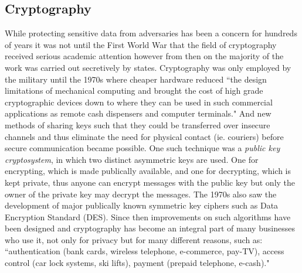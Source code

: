 \documentclass[12pt, titlepage]{article}
\begin{document}
\subsection*{Cryptography}
While protecting sensitive data from adversaries has been a concern for hundreds of years it was not until the First World War that the field of cryptography received serious academic attention however from then on the majority of the work was carried out secretively by states.\cite{appliedCryptoBook} Cryptography was only employed by the military until the 1970s where cheaper hardware reduced ``the design limitations of mechanical computing and brought the cost of high grade cryptographic devices down to where they can be used in such commercial applications as remote cash dispensers and computer terminals."\cite{newCryptoDirections} And new methods of sharing keys such that they could be transferred over insecure channels and thus eliminate the need for physical contact (ie. couriers) before secure communication became possible. One such technique was a \textit{public key cryptosystem}, in which two distinct asymmetric keys are used. One for encrypting, which is made publically available, and one for decrypting, which is kept private, thus anyone can encrypt messages with the public key but only the owner of the private key may decrypt the messages. The 1970s also saw the development of major publically known symmetric key ciphers such as Data Encryption Standard (DES). Since then improvements on such algorithms have been designed and cryptography has become an integral part of many businesses who use it, not only for privacy but for many different reasons, such as: ``authentication (bank cards, wireless telephone, e-commerce, pay-TV), access control (car lock systems, ski lifts), payment (prepaid telephone, e-cash)."\cite{classicalCryptoBook}
\end{document}
